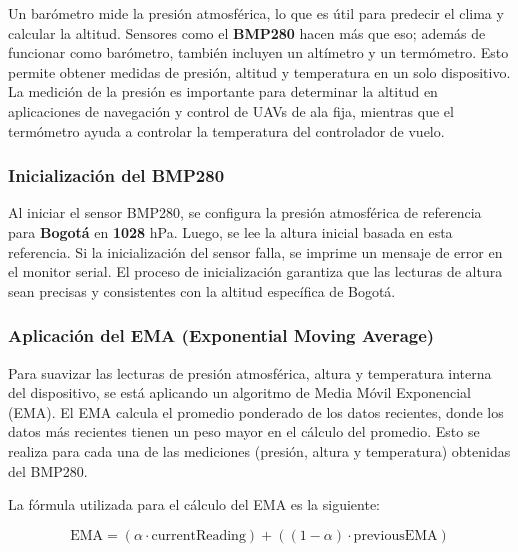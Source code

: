             Un barómetro mide la presión atmosférica, lo que es útil para predecir el clima y calcular la altitud. Sensores como el \textbf{BMP280} hacen más que eso; además de funcionar como barómetro, también incluyen un altímetro y un termómetro. Esto permite obtener medidas de presión, altitud y temperatura en un solo dispositivo. La medición de la presión es importante para determinar la altitud en aplicaciones de navegación y control de UAVs de ala fija, mientras que el termómetro ayuda a controlar la temperatura del controlador de vuelo. \vspace{5px}
            
            
            \subsubsection{Inicialización del BMP280}\vspace{5px}

                Al iniciar el sensor BMP280, se configura la presión atmosférica de referencia para \textbf{Bogotá} en \textbf{1028} hPa. Luego, se lee la altura inicial basada en esta referencia. Si la inicialización del sensor falla, se imprime un mensaje de error en el monitor serial. El proceso de inicialización garantiza que las lecturas de altura sean precisas y consistentes con la altitud específica de Bogotá.\vspace{5px}

            \subsubsection{Aplicación del EMA (Exponential Moving Average)}\vspace{5px}

                Para suavizar las lecturas de presión atmosférica, altura y temperatura interna del dispositivo, se está aplicando un algoritmo de Media Móvil Exponencial (EMA). El EMA calcula el promedio ponderado de los datos recientes, donde los datos más recientes tienen un peso mayor en el cálculo del promedio. Esto se realiza para cada una de las mediciones (presión, altura y temperatura) obtenidas del BMP280.\vspace{5px}

                La fórmula utilizada para el cálculo del EMA es la siguiente:\vspace{5px}
         
                \begin{equation}
                \text{EMA} = (\alpha \cdot \text{currentReading}) + ((1 - \alpha) \cdot \text{previousEMA})
                \end{equation}
                \vspace{5px}


